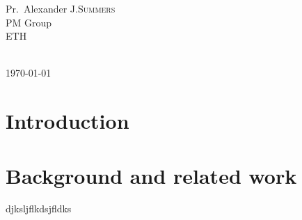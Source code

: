 \documentclass[titlepage,11pt,a4paper]{report}
\theoremstyle{plain}
\newcommand\blankpage{%
    \null
    \thispagestyle{empty}%
    \addtocounter{page}{-1}%
    \newpage}
\begin{document}
\begin{titlepage}
\begin{minipage}{0.4\textwidth}
\begin{flushright}
\large
Pr.~Alexander J.\textsc{Summers}\\ %
\small
PM Group\\
ETH
\end{flushright}
\end{minipage}\\[2cm]



{\large \today}\\[2cm] %


 

\vfill %

\afterpage{\blankpage}

\end{titlepage}




\tableofcontents

\afterpage{\blankpage}

\chapter{Introduction}

\chapter{Background and related work}
\label{ch:background}

djksljflkdsjfldks
\end{document}
